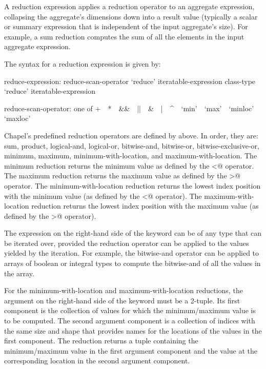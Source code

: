 A reduction expression applies a reduction operator to an aggregate
expression, collapsing the aggregate's dimensions down into a result
value (typically a scalar or summary expression that is independent of
the input aggregate's size).  For example, a sum reduction computes
the sum of all the elements in the input aggregate expression.

The syntax for a reduction expression is given by:
\begin{syntax}
reduce-expression:
  reduce-scan-operator `reduce' iteratable-expression
  class-type `reduce' iteratable-expression

reduce-scan-operator: one of
  + $ $ $ $ * $ $ $ $ && $ $ $ $ || $ $ $ $ & $ $ $ $ | $ $ $ $ ^ $ $ $ $ `min' $ $ $ $ `max' $ $ $ $ `minloc' $ $ $ $ `maxloc'
\end{syntax}

Chapel's predefined reduction operators are defined
by  above.  In order, they are: sum,
product, logical-and, logical-or, bitwise-and, bitwise-or,
bitwise-exclusive-or, minimum, maximum, minimum-with-location, and
maximum-with-location.  The minimum reduction returns the minimum
value as defined by the \verb@<@ operator.  The maximum reduction
returns the maximum value as defined by the \verb@>@ operator.  The
minimum-with-location reduction returns the lowest index position with
the minimum value (as defined by the \verb@<@ operator).  The
maximum-with-location reduction returns the lowest index position with
the maximum value (as defined by the \verb@>@ operator).

The expression on the right-hand side of the  keyword
can be of any type that can be iterated over, provided
the reduction operator can be applied to the values yielded
by the iteration. For example, the bitwise-and
operator can be applied to arrays of boolean or integral types to
compute the bitwise-and of all the values in the array.

For the minimum-with-location and maximum-with-location reductions,
the argument on the right-hand side of the  keyword
must be a 2-tuple. Its first component is the collection
of values for which the minimum/maximum value is to be computed.  The
second argument component is a collection of indices with the same size and
shape that provides names for the locations of the values in the first
component.  The reduction returns a tuple containing the
minimum/maximum value in the first argument component and the value
at the corresponding location in the second argument component.

